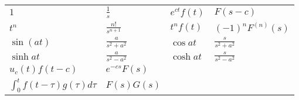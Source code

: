 \documentclass[a4paper,12pt]{article}
\begin{document}
\begin{tabular}{l l l l}
$1$&	$\frac{1}{s}$&	$e^{ct}f(t)$&	$F(s-c)$\\
$t^n$&	$\frac{n!}{s^{n+1}}$&	$t^nf(t)$&	$(-1)^nF^{(n)}(s)$\\
$\sin (at)$&	$\frac{a}{s^2+a^2}$&	$\cos {at}$&	$\frac{s}{s^2+a^2}$\\
$\sinh {at}$&	$\frac{a}{s^2- a^2}$&	$\cosh {at}$&	$\frac{s}{s^2-a^2}$\\
$u_c(t)f(t-c)$&	$e^{-cs}F(s)$&	&	\\
$\int_0^t {f(t-\tau)g(\tau) d\tau}$&	$F(s)G(s)$&	&	\\

\end{tabular}
\end{document}
